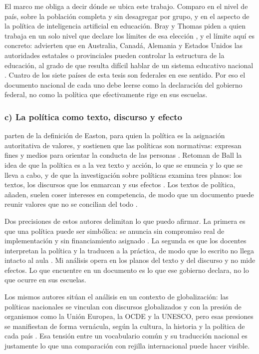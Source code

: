 El marco me obliga a decir dónde se ubica este trabajo. Comparo en el nivel de país, sobre
la población completa y sin desagregar por grupo, y en el aspecto de la política de
inteligencia artificial en educación. Bray y Thomas piden a quien trabaja en un solo nivel
que declare los límites de esa elección \citep[p.~488]{bray1995levels}, y el límite aquí es
concreto: advierten que en Australia, Canadá, Alemania y Estados Unidos las autoridades
estatales o provinciales pueden controlar la estructura de la educación, al grado de que
resulta difícil hablar de un sistema educativo nacional \citep[p.~479]{bray1995levels}.
Cuatro de los siete países de esta tesis son federales en ese sentido. Por eso el documento
nacional de cada uno debe leerse como la declaración del gobierno federal, no como la
política que efectivamente rige en sus escuelas.

\subsubsection*{c) La política como texto, discurso y efecto}

\citet{rizvi2010globalizing} parten de la definición de Easton, para quien la política es
la asignación autoritativa de valores, y sostienen que las políticas
son normativas: expresan fines y medios para orientar la conducta de las personas
\citep[pp.~4, 7]{rizvi2010globalizing}. Retoman de Ball la idea de que la política es a la
vez texto y acción, lo que se enuncia y lo que se lleva a cabo, y de que la investigación
sobre políticas examina tres planos: los textos, los discursos que los enmarcan y sus
efectos \citep[pp.~4--5, 12]{rizvi2010globalizing}. Los textos de política, añaden, suelen
coser intereses en competencia, de modo que un documento puede reunir valores que no se
concilian del todo \citep[p.~6]{rizvi2010globalizing}.

Dos precisiones de estos autores delimitan lo que puedo afirmar. La primera es que una
política puede ser simbólica: se anuncia sin compromiso real de implementación y sin
financiamiento asignado \citep[p.~9]{rizvi2010globalizing}. La segunda es que los docentes
interpretan la política y la traducen a la práctica, de modo que lo escrito no llega
intacto al aula \citep[pp.~5--6]{rizvi2010globalizing}. Mi análisis opera en los planos del
texto y del discurso y no mide efectos. Lo que encuentre en un documento es lo que ese
gobierno declara, no lo que ocurre en sus escuelas.

Los mismos autores sitúan el análisis en un contexto de globalización: las políticas
nacionales se vinculan con discursos globalizados y con la presión de organismos como la
Unión Europea, la OCDE y la UNESCO, pero esas presiones se manifiestan de forma vernácula,
según la cultura, la historia y la política de cada país
\citep[pp.~x, xii]{rizvi2010globalizing}. Esa tensión entre un vocabulario común y su
traducción nacional es justamente lo que una comparación con rejilla internacional puede
hacer visible.

